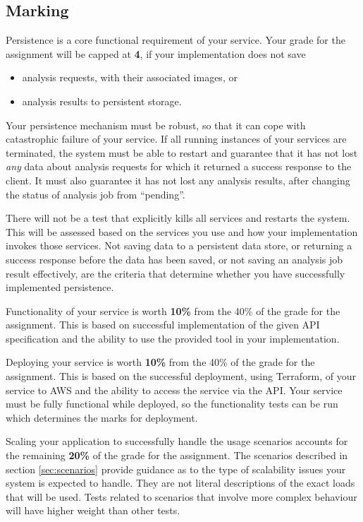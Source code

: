 \documentclass{csse4400}
\begin{document}
\subsection{Marking}
Persistence is a core functional requirement of your service.
Your grade for the assignment will be capped at \textbf{4}, if your implementation does not save
\begin{itemize}[topsep=2pt,partopsep=0pt,itemsep=1pt,parsep=1pt]
    \item analysis requests, with their associated images, or 
    \item analysis results to persistent storage.
\end{itemize}

Your persistence mechanism must be robust, so that it can cope with catastrophic failure of your service.
If all running instances of your services are terminated,
the system must be able to restart and guarantee that it has not lost \textit{any} data
about analysis requests for which it returned a success response to the client.
It must also guarantee it has not lost any analysis results,
after changing the status of analysis job from ``pending''.

There will not be a test that explicitly kills all services and restarts the system.
This will be assessed based on the services you use and how your implementation invokes those services.
Not saving data to a persistent data store, or returning a success response before the data has been saved,
or not saving an analysis job result effectively,
are the criteria that determine whether you have successfully implemented persistence.

Functionality of your service is worth \textbf{10\%} from the 40\% of the grade for the assignment.
This is based on successful implementation of the given API specification
and the ability to use the provided tool in your implementation.

Deploying your service is worth \textbf{10\%} from the 40\% of the grade for the assignment.
This is based on the successful deployment, using Terraform,
of your service to AWS and the ability to access the service via the API.
Your service must be fully functional while deployed,
so the functionality tests can be run which determines the marks for deployment.

Scaling your application to successfully handle the usage scenarios accounts for the remaining \textbf{20\%}
of the grade for the assignment.
The scenarios described in section \ref{sec:scenarios} provide guidance
as to the type of scalability issues your system is expected to handle.
They are not literal descriptions of the exact loads that will be used.
Tests related to scenarios that involve more complex behaviour will have higher weight than other tests.
\end{document}

